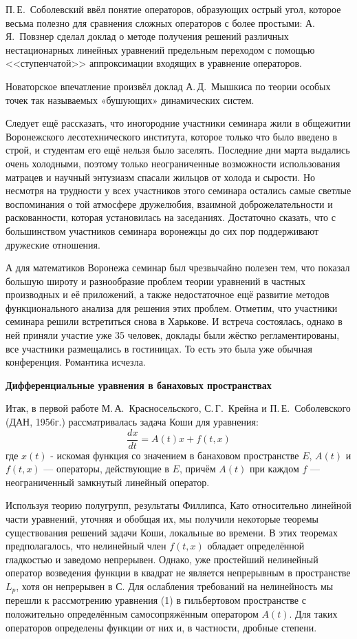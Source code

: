 П.\,Е.~Соболевский ввёл понятие операторов, образующих острый угол,  которое весьма полезно для сравнения сложных операторов с более простыми: А.\,Я.~Повзнер сделал доклад о методе получения решений различных нестационарных линейных уравнений предельным переходом с помощью <<ступенчатой>>  аппроксимации входящих в уравнение операторов.

Новаторское впечатление произвёл доклад А.\,Д.~Мышкиса по теории особых точек так называемых «бушующих» динамических систем.

 	Следует ещё рассказать, что иногородние участники семинара жили в общежитии Воронежского лесотехнического института, которое только что было введено в строй, и студентам его ещё нельзя было заселять. Последние дни марта выдались очень холодными, поэтому только неограниченные возможности использования матрацев и научный энтузиазм спасали жильцов от холода и сырости. Но несмотря на трудности у всех участников этого семинара остались самые светлые воспоминания о той атмосфере дружелюбия, взаимной доброжелательности и раскованности, которая установилась на заседаниях. Достаточно сказать, что с большинством участников семинара воронежцы до сих пор поддерживают дружеские отношения.

А для математиков Воронежа семинар был чрезвычайно полезен тем, что показал большую широту и разнообразие проблем теории уравнений в       частных производных и её приложений, а также недостаточное ещё развитие методов функционального анализа для решения этих проблем.
Отметим, что участники семинара решили встретиться снова в Харькове. И встреча состоялась, однако в ней приняли участие уже 35 человек, доклады были жёстко регламентированы, все участники размещались в гостиницах. То есть это была уже обычная конференция. Романтика исчезла.

{\bf Дифференциальные уравнения в банаховых пространствах}

Итак, в первой работе М.\,А.~Красносельского, С.\,Г.~Крейна и П.\,Е.~Соболевского (ДАН, 1956г.) рассматривалась задача Коши для уравнения:
\begin{equation}
\frac{dx}{dt} = A(t)x + f(t, x)
\end{equation}
где $x(t)$ - искомая функция со значением в банаховом пространстве $E$, $A(t)$ и $f(t,x)$ --- операторы, действующие в $E$, причём $A(t)$ при каждом $f$ --- неограниченный замкнутый линейный оператор.

Используя теорию полугрупп, результаты Филлипса, Като относительно линейной части уравнений, уточняя и обобщая их, мы получили некоторые теоремы существования решений задачи Коши, локальные во времени. В этих теоремах предполагалось, что нелинейный член $f(t,x)$ обладает определённой гладкостью и заведомо непрерывен. Однако, уже простейший нелинейный оператор возведения функции в квадрат не является непрерывным в пространстве $L_p$, хотя он непрерывен в С. Для ослабления требований на нелинейность мы перешли к рассмотрению уравнения (1) в гильбертовом пространстве с положительно определённым самосопряжённым оператором $A(t)$. Для таких операторов определены функции от них и, в частности, дробные степени.

